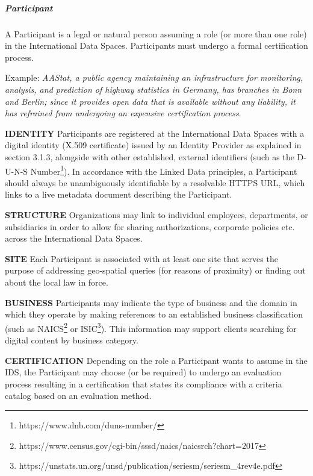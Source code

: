 \subparagraph*{Participant}
A Participant is a legal or natural person assuming a role (or more than one role) in the International Data Spaces. Participants must undergo a formal certification process.  

Example: \textit{AAStat, a public agency maintaining an infrastructure for monitoring, analysis, and prediction of highway statistics in Germany, has branches in Bonn and Berlin; since it provides open data that is available without any liability, it has refrained from undergoing an expensive certification process}.

\textbf{IDENTITY} Participants are registered at the International Data Spaces with a digital identity (X.509 certificate) issued by an Identity Provider as explained in section 3.1.3,
alongside with other established, external identifiers (such as the D-U-N-S Number\footnote{https://www.dnb.com/duns-number/ }). In accordance with the Linked Data principles, a Participant should always be unambiguously identifiable by a resolvable HTTPS URL, which links to a live metadata document describing the Participant.

\textbf{STRUCTURE} Organizations may link to individual employees, departments, or subsidiaries in order to allow for sharing authorizations, corporate policies etc. across the International Data Spaces. 

\textbf{SITE} Each Participant is associated with at least one site that serves the purpose of addressing geo-spatial queries (for reasons of proximity) or finding out about the local law in force. 

\textbf{BUSINESS} Participants may indicate the type of business and the domain in which they operate by making references to an established business classification (such as NAICS\footnote{https://www.census.gov/cgi-bin/sssd/naics/naicsrch?chart=2017 } or ISIC\footnote{https://unstats.un.org/unsd/publication/seriesm/seriesm\_4rev4e.pdf }). This information may support clients searching for digital content by business category. 

\textbf{CERTIFICATION} Depending on the role a Participant wants to assume in the IDS, the Participant may choose (or be required) to undergo an evaluation process resulting in a certification that states its compliance with a criteria catalog based on an evaluation method.




